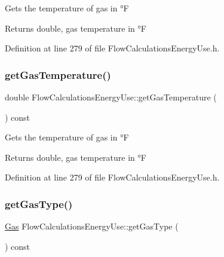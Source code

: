 Gets the temperature of gas in °F

\begin{DoxyReturn}{Returns}
double, gas temperature in °F 
\end{DoxyReturn}


Definition at line 279 of file Flow\+Calculations\+Energy\+Use.\+h.

\mbox{\label{class_flow_calculations_energy_use_a9d5782d594530c0345ac3c8faff252b3}} 
\subsubsection{\texorpdfstring{get\+Gas\+Temperature()}{getGasTemperature()}\hspace{0.1cm}{\footnotesize\ttfamily [3/3]}}
{\footnotesize\ttfamily double Flow\+Calculations\+Energy\+Use\+::get\+Gas\+Temperature (\begin{DoxyParamCaption}{ }\end{DoxyParamCaption}) const\hspace{0.3cm}{\ttfamily [inline]}}

Gets the temperature of gas in °F

\begin{DoxyReturn}{Returns}
double, gas temperature in °F 
\end{DoxyReturn}


Definition at line 279 of file Flow\+Calculations\+Energy\+Use.\+h.

\mbox{\label{class_flow_calculations_energy_use_a04df0a0c655c4aef3d5a4539d57fec2e}} 
\subsubsection{\texorpdfstring{get\+Gas\+Type()}{getGasType()}\hspace{0.1cm}{\footnotesize\ttfamily [1/3]}}
{\footnotesize\ttfamily \hyperlink{class_flow_calculations_energy_use_a840d5a836e7b05d6791b79bace4440f2}{Gas} Flow\+Calculations\+Energy\+Use\+::get\+Gas\+Type (\begin{DoxyParamCaption}{ }\end{DoxyParamCaption}) const\hspace{0.3cm}{\ttfamily [inline]}}

